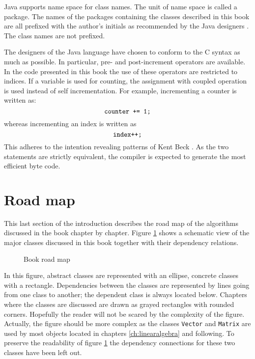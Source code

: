 \documentclass[twoside]{book}
\begin{document}
Java supports name space for class names. The unit of name space
is called a package. The names of the packages containing the
classes described in this book are all prefixed with the author's
initials as recommended by the Java designers . The class names
are not prefixed.

The designers of the Java language have chosen to conform to the C
syntax as much as possible. In particular, pre- and post-increment
operators are available. In the code presented in this book the
use of these operators are restricted to indices. If a variable is
used for counting, the assignment with coupled operation is used
instead of self incrementation. For example, incrementing a
counter is written as:
\begin{equation}
\hbox{\tt counter += 1;}
\end{equation}
whereas incrementing an index is written as
\begin{equation}
\hbox{\tt index++;}
\end{equation}
This adheres to the intention revealing patterns of Kent Beck
\cite{Beck}. As the two statements are strictly equivalent, the
compiler is expected to generate the most efficient byte code.

\section{Road map}
This last section of the introduction describes the road map of
the algorithms discussed in the book chapter by chapter. Figure
\ref{fig:roadmap} shows a schematic view of the major classes
discussed in this book together with their dependency relations.
\begin{figure}
\center{}
\caption{Book road map} \label{fig:roadmap}
\end{figure}
In this figure, abstract classes are represented with an ellipse,
concrete classes with a rectangle. Dependencies between the
classes are represented by lines going from one class to another;
the dependent class is always located below. Chapters where the
classes are discussed are drawn as grayed rectangles with rounded
corners. Hopefully the reader will not be scared by the complexity
of the figure. Actually, the figure should be more complex as the
classes {\tt Vector} and {\tt Matrix} are used by most objects
located in chapters \ref{ch:linearalgebra} and following. To
preserve the readability of figure \ref{fig:roadmap} the
dependency connections for these two classes have been left out.
\end{document}
